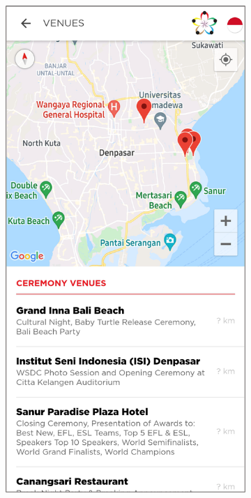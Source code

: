 \begin{figure}[H]
     \centering
     \begin{subfigure}[b]{0.21\textwidth}
        \centering
	    \includegraphics[scale=0.4]{Gambar/VenuesMapPage.png}

\end{subfigure}
\end{figure}
